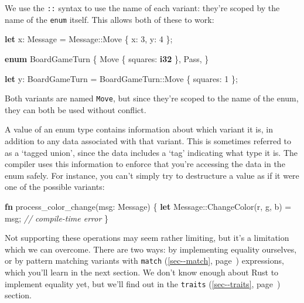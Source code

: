 \documentclass[a4paper,]{book}
\renewcommand*{\hyperref}[2][\ar]{%
  \def\ar{#2}%
  #2 (\autoref{#1}, page~\pageref{#1})}
\newenvironment{Shaded}{\begin{snugshade}}{\end{snugshade}}
\newcommand{\KeywordTok}[1]{\textcolor[rgb]{0.13,0.29,0.53}{\textbf{{#1}}}}
\newcommand{\DecValTok}[1]{\textcolor[rgb]{0.00,0.00,0.81}{{#1}}}
\newcommand{\CommentTok}[1]{\textcolor[rgb]{0.56,0.35,0.01}{\textit{{#1}}}}
\newcommand{\NormalTok}[1]{{#1}}
\begin{document}
We use the \texttt{::} syntax to use the name of each variant: they're
scoped by the name of the \texttt{enum} itself. This allows both of
these to work:

\begin{Shaded}
\begin{Highlighting}[]
\KeywordTok{let} \NormalTok{x: Message = Message::Move \{ x: }\DecValTok{3}\NormalTok{, y: }\DecValTok{4} \NormalTok{\};}

\KeywordTok{enum} \NormalTok{BoardGameTurn \{}
    \NormalTok{Move \{ squares: }\KeywordTok{i32} \NormalTok{\},}
    \NormalTok{Pass,}
\NormalTok{\}}

\KeywordTok{let} \NormalTok{y: BoardGameTurn = BoardGameTurn::Move \{ squares: }\DecValTok{1} \NormalTok{\};}
\end{Highlighting}
\end{Shaded}

Both variants are named \texttt{Move}, but since they're scoped to the
name of the enum, they can both be used without conflict.

A value of an enum type contains information about which variant it is,
in addition to any data associated with that variant. This is sometimes
referred to as a `tagged union', since the data includes a `tag'
indicating what type it is. The compiler uses this information to
enforce that you're accessing the data in the enum safely. For instance,
you can't simply try to destructure a value as if it were one of the
possible variants:

\begin{Shaded}
\begin{Highlighting}[]
\KeywordTok{fn} \NormalTok{process_color_change(msg: Message) \{}
    \KeywordTok{let} \NormalTok{Message::ChangeColor(r, g, b) = msg; }\CommentTok{// compile-time error}
\NormalTok{\}}
\end{Highlighting}
\end{Shaded}

Not supporting these operations may seem rather limiting, but it's a
limitation which we can overcome. There are two ways: by implementing
equality ourselves, or by pattern matching variants with
\hyperref[sec--match]{\texttt{match}} expressions, which you'll learn in
the next section. We don't know enough about Rust to implement equality
yet, but we'll find out in the \hyperref[sec--traits]{\texttt{traits}}
section.

\end{document}
